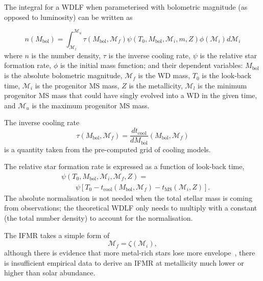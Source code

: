 \documentclass[fleqn,usenatbib]{mnras}
\begin{document}
The integral for a WDLF when parameterised with bolometric magnitude (as
opposed to luminosity) can be written as

\begin{equation}
    n(M_{\mathrm{bol}}) = \int_{\mathcal{M}_l}^{\mathcal{M}_u}
        \tau(M_\mathrm{bol}, \mathcal{M}_f)
        \psi(T_0, M_\mathrm{bol}, \mathcal{M}_i, m, Z)
        \phi(\mathcal{M}_i) d\mathcal{M}_i
\end{equation}
where $n$ is the number density, $\tau$ is the inverse cooling rate, $\psi$ is
the relative star formation rate, $\phi$ is the initial mass function; and their
dependent variables: $M_\mathrm{bol}$ is the absolute bolometric
magnitude, $\mathcal{M}_f$ is the WD mass, $T_0$ is the look-back time, $\mathcal{M}_i$ is
the progenitor MS mass, $Z$ is the metallicity, $\mathcal{M}_l$ is the minimum
progenitor MS mass that could have singly evolved into a WD in the given time,
and $\mathcal{M}_u$ is the maximum progenitor MS mass.

The inverse cooling rate
\begin{equation}
    \tau(M_\mathrm{bol}, \mathcal{M}_f) = \dfrac{dt_{\mathrm{cool}}}{dM_\mathrm{bol}} \left( M_\mathrm{bol}, \mathcal{M}_f \right)
\end{equation}
is a quantity taken from the pre-computed grid of cooling models. 

The relative star formation rate is expressed as a function of look-back time,
\begin{align}
    &\psi(T_0, M_\mathrm{bol}, \mathcal{M}_i, \mathcal{M}_f, Z) =\\
    &\qquad\psi\left[T_0 - t_{\mathrm{cool}}\left(M_\mathrm{bol}, \mathcal{M}_f\right) - t_{\mathrm{MS}}\left(\mathcal{M}_i, Z\right)\right].
\end{align}
The absolute normalisation is not needed when the total stellar mass is coming
from observations; the theoretical WDLF only needs to multiply with a
constant (the total number density) to account for the normalisation.

The IFMR takes a simple form of
\begin{equation}
    \mathcal{M}_f = \zeta(\mathcal{M}_i),
\end{equation}
although there is evidence that more metal-rich stars lose more
envelope~\citep{2007ApJ...671..761K}, there is insufficient empirical data
to derive an IFMR at metallicity much lower or higher than solar abundance.
\end{document}
